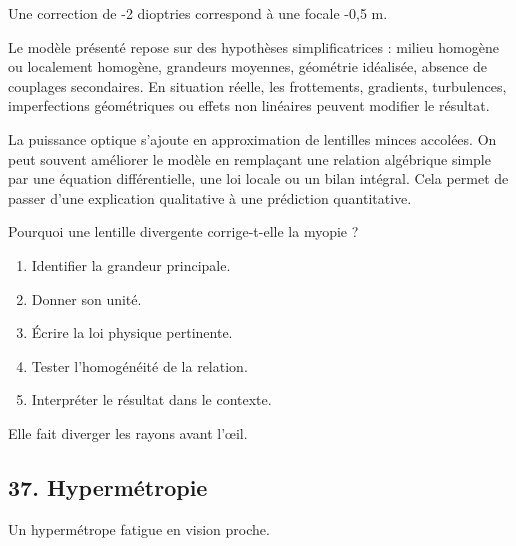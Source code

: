 \documentclass[11pt,a4paper]{article}
\begin{document}
\begin{odgbox}
Une correction de -2 dioptries correspond à une focale -0,5 m.
\end{odgbox}

\begin{attentionbox}
Le modèle présenté repose sur des hypothèses simplificatrices : milieu homogène ou localement homogène, grandeurs moyennes, géométrie idéalisée, absence de couplages secondaires. En situation réelle, les frottements, gradients, turbulences, imperfections géométriques ou effets non linéaires peuvent modifier le résultat.
\end{attentionbox}

\begin{approfondissementbox}
La puissance optique s'ajoute en approximation de lentilles minces accolées.
On peut souvent améliorer le modèle en remplaçant une relation algébrique simple par une équation différentielle, une loi locale ou un bilan intégral. Cela permet de passer d'une explication qualitative à une prédiction quantitative.
\end{approfondissementbox}

\begin{exercicebox}
Pourquoi une lentille divergente corrige-t-elle la myopie ?
\begin{enumerate}
  \item Identifier la grandeur principale.
  \item Donner son unité.
  \item Écrire la loi physique pertinente.
  \item Tester l'homogénéité de la relation.
  \item Interpréter le résultat dans le contexte.
\end{enumerate}
\end{exercicebox}

\begin{corrigebox}[Indication]
Elle fait diverger les rayons avant l'œil.
\end{corrigebox}


\subsection{37. Hypermétropie}

\begin{exemplebox}
Un hypermétrope fatigue en vision proche.
\end{exemplebox}
\end{document}
